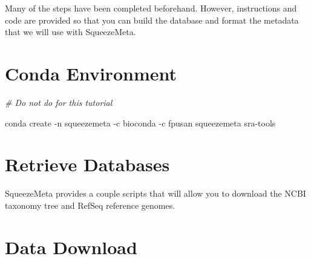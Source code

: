 \documentclass[
]{book}
\newenvironment{Shaded}{\begin{snugshade}}{\end{snugshade}}
\newcommand{\AttributeTok}[1]{\textcolor[rgb]{0.77,0.63,0.00}{#1}}
\newcommand{\BuiltInTok}[1]{#1}
\newcommand{\CommentTok}[1]{\textcolor[rgb]{0.56,0.35,0.01}{\textit{#1}}}
\newcommand{\ExtensionTok}[1]{#1}
\newcommand{\FunctionTok}[1]{\textcolor[rgb]{0.00,0.00,0.00}{#1}}
\newcommand{\NormalTok}[1]{#1}
\newcommand{\VariableTok}[1]{\textcolor[rgb]{0.00,0.00,0.00}{#1}}
\begin{document}
Many of the steps have been completed beforehand. However, instructions and code are provided so that you
can build the database and format the metadata that we will use with SqueezeMeta.

\hypertarget{conda-environment}{%
\section{Conda Environment}\label{conda-environment}}

\begin{Shaded}
\begin{Highlighting}[]
\CommentTok{\# Do not do for this tutorial}

\ExtensionTok{conda}\NormalTok{ create }\AttributeTok{{-}n}\NormalTok{ squeezemeta }\AttributeTok{{-}c}\NormalTok{ bioconda }\AttributeTok{{-}c}\NormalTok{ fpusan squeezemeta sra{-}tools}
\end{Highlighting}
\end{Shaded}

\hypertarget{retrieve-databases}{%
\section{Retrieve Databases}\label{retrieve-databases}}

SqueezeMeta provides a couple scripts that will allow you to download the NCBI taxonomy tree and RefSeq
reference genomes.

\begin{Shaded}
\end{Shaded}

\hypertarget{data-download-1}{%
\section{Data Download}\label{data-download-1}}
\end{document}
